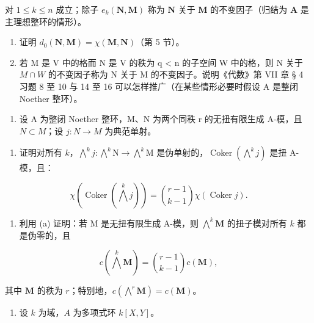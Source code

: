 对 \(1 \leqslant k \leqslant n\) 成立；除子 \(e_k(\mathbf{N}, \mathbf{M})\) 称为 \(\mathbf{N}\) 关于 \(\mathbf{M}\) 的不变因子（归结为 \(\mathbf{A}\) 是主理想整环的情形）。

\begin{enumerate}
\def\labelenumi{(\alph{enumi})}
\setcounter{enumi}{2}
\item
  证明 \(d_0(\mathbf{N}, \mathbf{M}) = \chi(\mathbf{M}, \mathbf{N})\)（第 5 节）。
\item
  若 M 是 V 中的格而 N 是 V 的秩为 q \textless{} n 的子空间 W 中的格，则 N 关于 \(M \cap W\) 的不变因子称为 N 关于 M 的不变因子。说明《代数》第 VII 章 § 4 习题 8 至 10 与 14 至 16 可以怎样推广（在某些情形必要时假设 A 是整闭 Noether 整环）。
\end{enumerate}

\begin{enumerate}
\def\labelenumi{\arabic{enumi}.}
\setcounter{enumi}{11}
\tightlist
\item
  设 A 为整闭 Noether 整环，M、N 为两个同秩 r 的无扭有限生成 A-模，且 \(N \subset M\)；设 \(j: N \to M\) 为典范单射。
\end{enumerate}

\begin{enumerate}
\def\labelenumi{(\alph{enumi})}
\tightlist
\item
  证明对所有 \(k\)，\(\bigwedge^{k}j\colon\bigwedge^{k}\mathrm{N}\to\bigwedge^{k}\mathrm{M}\) 是伪单射的，\(\operatorname{Coker}\left(\bigwedge^{k}j\right)\) 是扭 A-模，且：
\end{enumerate}

\[
\chi \left(\operatorname{Coker} \left(\bigwedge^ {k} j\right)\right) = \binom {r - 1} {k - 1} \chi (\operatorname{Coker} j).
\]

\begin{enumerate}
\def\labelenumi{(\alph{enumi})}
\setcounter{enumi}{1}
\tightlist
\item
  利用 (a) 证明：若 M 是无扭有限生成 A-模，则 \(\bigwedge^{k}\mathbf{M}\) 的扭子模对所有 \(k\) 都是伪零的，且
\end{enumerate}

\[
c \left(\bigwedge^ {k} \mathbf {M}\right) = \binom {r - 1} {k - 1} c (\mathbf {M}),
\]

其中 \(\mathbf{M}\) 的秩为 \(r\)；特别地，\(c\left(\bigwedge^{r}\mathbf{M}\right) = c(\mathbf{M})\)。

\begin{enumerate}
\def\labelenumi{\arabic{enumi}.}
\setcounter{enumi}{12}
\tightlist
\item
  设 \(k\) 为域，\(A\) 为多项式环 \(k[X, Y]\)。
\end{enumerate}

